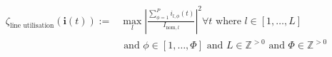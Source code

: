 \begin{equation}
\begin{split}
	\zeta_\text{line utilisation}(\textbf{i}(t)) :=& %
	\max_{l}{\left|\frac{\sum_{\phi=1}^{P}{i_{l,\phi}(t)}}{I_{\text{nom},l}}\right|^2} \forall t \text{ where } l \in [1, \dots, L] \\
	&\text{ and } \phi \in [1, \dots, \Phi] \text{ and } L \in \mathbb{Z}^{>0} \text{ and } \Phi \in \mathbb{Z}^{>0}
\end{split}
\label{ch1:equ:line-utilisation}
\end{equation}